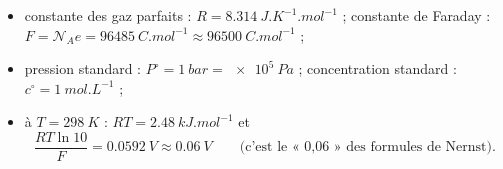 \begin{ordres}
\begin{itemize}
  \item constante des gaz parfaits : $R = \SI{8,314}{J.K^{-1}.mol^{-1}}$ ; constante de Faraday : $F = \mathcal{N}_A e = \SI{96485}{C.mol^{-1}} \approx \SI{96500}{C.mol^{-1}}$ ;
  \item pression standard : $P^\circ = \SI{1}{bar} = \SI{e5}{Pa}$ ; concentration standard : $c^\circ = \SI{1}{mol.L^{-1}}$ ;
  \item à $T = \SI{298}{K}$ : $RT = \SI{2,48}{kJ.mol^{-1}}$ et
  \[ \frac{RT\ln 10}{F} = \SI{0,0592}{V} \approx \SI{0,06}{V} \qquad\text{(c'est le « 0,06 » des formules de Nernst).} \]
\end{itemize}
\end{ordres}
